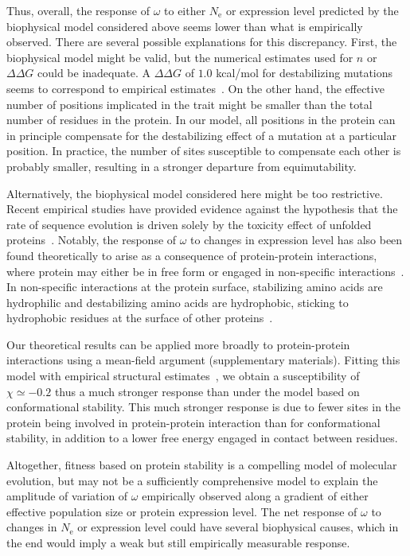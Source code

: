 \documentclass[authoryear]{elsarticle} %
\newcommand{\Ne}{N_{\text{e}}} %
\newcommand{\NbrSites}{n} %
\newcommand{\G}{G} %
\newcommand{\DeltaG}{\Delta \G} %
\newcommand{\EmpiricalDeltaDeltaG}{\Delta \DeltaG} %
\begin{document}
Thus, overall, the response of $\omega$ to either $\Ne$ or expression level predicted by the biophysical model considered above seems lower than what is empirically observed.
There are several possible explanations for this discrepancy.
First, the biophysical model might be valid, but the numerical estimates used for $\NbrSites$ or $\EmpiricalDeltaDeltaG$ could be inadequate.
A $\EmpiricalDeltaDeltaG$ of $1.0$ kcal/mol for destabilizing mutations seems to correspond to empirical estimates~\citep{Zeldovich2007}.
On the other hand, the effective number of positions implicated in the trait might be smaller than the total number of residues in the protein.
In our model, all positions in the protein can in principle compensate for the destabilizing effect of a mutation at a particular position.
In practice, the number of sites susceptible to compensate each other is probably smaller, resulting in a stronger departure from equimutability.

Alternatively, the biophysical model considered here might be too restrictive.
Recent empirical studies have provided evidence against the hypothesis that the rate of sequence evolution is driven solely by the toxicity effect of unfolded proteins~\citep{Plata2017,Razban2019,Biesiadecka2020}.
Notably, the response of $\omega$ to changes in expression level has also been found theoretically to arise as a consequence of protein-protein interactions, where protein may either be in free form or engaged in non-specific interactions~\citep{Yang2012, Zhang2013}.
In non-specific interactions at the protein surface, stabilizing amino acids are hydrophilic and destabilizing amino acids are hydrophobic, sticking to hydrophobic residues at the surface of other proteins~\citep{Dixit2013,Manhart2015}.

Our theoretical results can be applied more broadly to protein-protein interactions using a mean-field argument (supplementary materials).
Fitting this model with empirical structural estimates~\citep{Janin1995a, Zhang2008}, we obtain a susceptibility of $\chi \simeq -0.2$ thus a much stronger response than under the model based on conformational stability.
This much stronger response is due to fewer sites in the protein being involved in protein-protein interaction than for conformational stability, in addition to a lower free energy engaged in contact between residues.

Altogether, fitness based on protein stability is a compelling model of molecular evolution, but may not be a sufficiently comprehensive model to explain the amplitude of variation of $\omega$ empirically observed along a gradient of either {effective population size} or protein expression level.
The net response of $\omega$ to changes in $\Ne$ or expression level could have several biophysical causes, which in the end would imply a weak but still empirically measurable response.
\end{document}
